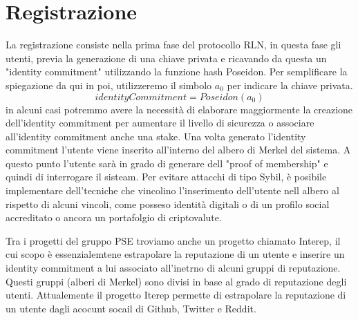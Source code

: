\section{Registrazione}
La registrazione consiste nella prima fase del protocollo RLN, in questa fase gli utenti, previa la generazione di una chiave privata e ricavando da questa un "identity commitment" utilizzando la funzione hash Poseidon. Per semplificare la spiegazione da qui in poi, utilizzeremo il simbolo $a_0$ per indicare la chiave privata.
$$identityCommitment = Poseidon(a_0)$$
in alcuni casi potremmo avere la necessità di elaborare maggiormente la creazione dell'identity commitment per aumentare il livello di sicurezza o associare all'identity commitment anche una stake. Una volta generato l'identity commitment l'utente viene inserito all'interno del albero di Merkel del sistema. A questo punto l'utente sarà in grado di generare dell "proof of membership" e quindi di interrogare il sisteam. Per evitare attacchi di tipo Sybil, è posibile implementare dell'tecniche che vincolino l'inserimento dell'utente nell albero al rispetto di alcuni vincoli, come posseso identità digitali o di un profilo social accreditato o ancora un portafolgio di criptovalute.

Tra i progetti del gruppo PSE troviamo anche un progetto chiamato Interep, il cui scopo è essenzialemtene estrapolare la reputazione di un utente e inserire un identity commitment a lui associato all'inetrno di alcuni gruppi di reputazione. Questi gruppi (alberi di Merkel) sono divisi in base al grado di reputazione degli utenti. Attualemente il progetto Iterep permette di estrapolare la reputazione di un utente dagli acocunt socail di Github, Twitter e Reddit.